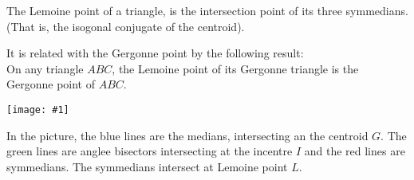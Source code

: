 \documentclass[12pt]{article}
\newcommand{\figura}[1]{\begin{center}\texttt{[image: \#1]}\end{center}}
\begin{document}
The Lemoine point of a triangle, is the intersection point of its three symmedians. (That is, the isogonal conjugate of the centroid).

It is related with the Gergonne point by the following result: \\
On any triangle $ABC$, the Lemoine point of its Gergonne triangle is the Gergonne point of $ABC$.
\figura{lemoinep}
In the picture, the blue lines are the medians, intersecting an the centroid  $G$.
The green lines are anglee bisectors intersecting at the incentre $I$ and the red lines are symmedians. The symmedians intersect at Lemoine point $L$.
\end{document}
